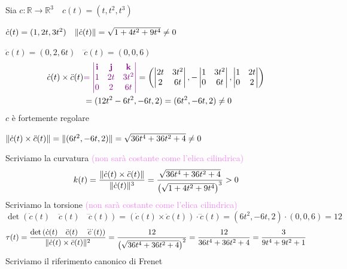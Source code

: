         \begin{esempio}
        \mbox{}

        Sia $c \colon \mathbb{R} \to \mathbb{R}^3 \quad c(t) = (t, t^2, t^3)$

        $\dot{c}(t)=(1, 2t, 3t^2) \quad \lVert\dot{c}(t)\rVert = \sqrt{1 + 4t^2 + 9t^4} \neq 0$

        $\ddot{c}(t)=(0, 2, 6t) \quad \dddot{c}(t)=(0, 0, 6)$
        \begin{align*}
        \dot{c}(t) \times \ddot{c}(t) & \textcolor{violet}{= \left| \begin{matrix} \mathbf{i} & \mathbf{j} & \mathbf{k} \\ 1 & 2t & 3t^2 \\ 0 & 2 & 6t \end{matrix} \right|} = 
        \left( \begin{vmatrix}
        2t & 3t^2 \\
        2 & 6t
        \end{vmatrix}, 
        -\begin{vmatrix}
        1 & 3t^2 \\
        0 & 6t
        \end{vmatrix},
        \begin{vmatrix}
        1 & 2t \\
        0 & 2
        \end{vmatrix} \right) \\ 
        &=(12t^2 - 6t^2, -6t, 2) = (6t^2, -6t, 2) \neq 0
        \end{align*}
        $c$ è fortemente regolare

        $\lVert\dot{c}(t) \times \ddot{c}(t)\rVert = \lVert(6t^2, -6t, 2)\rVert = \sqrt{36t^4 + 36t^2 + 4} \neq 0$

        Scriviamo la curvatura \textcolor{violet}{(non sarà costante come l'elica cilindrica)}
        \[ k(t)=\frac{\lVert\dot{c}(t) \times \ddot{c}(t)\rVert}{\lVert\dot{c}(t)\rVert^3} = \frac{\sqrt{36t^4 + 36t^2 + 4}}{\left(\sqrt{1 + 4t^2 + 9t^4}\right)^3} > 0 \]
        Scriviamo la torsione   \textcolor{violet}{(non sarà costante come l'elica cilindrica)}
        \[ \det \left( \dot{c}(t) \quad \ddot{c}(t) \quad \dddot{c}(t)  \right) = \left( \dot{c}(t) \times \ddot{c}(t) \right) \cdot \dddot{c}(t) = (6t^2, -6t, 2) \cdot (0, 0, 6) = 12 \]
        \[ \tau(t) = \frac{\det \left( \dot{c}(t) \quad \ddot{c}(t) \quad \dddot{c}(t)  \right)}{\lVert\dot{c}(t) \times \ddot{c}(t)\rVert^2} = \frac{12}{\left(\sqrt{36t^4 + 36t^2 + 4}\right)^2} = \frac{12}{36t^4 + 36t^2 + 4} = \frac{3}{9t^4 + 9t^2 + 1} \]
        Scriviamo il riferimento canonico di Frenet


\end{esempio}
